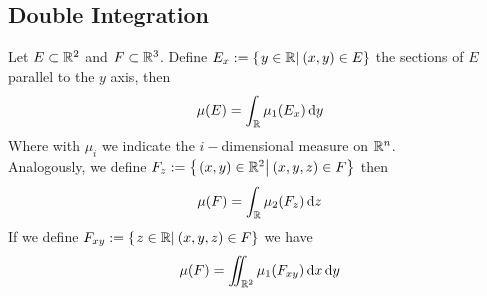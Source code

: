 \documentclass[../complete.tex]{subfiles}
\begin{document}
\subsection{Double Integration}
\begin{thm}
	Let $E\subset\mathbb{R}^2$ and $F\subset\mathbb{R}^3$. Define $E_x:=\left\{ \left.y\in\mathbb{R}\right|_{}(x,y)\in E \right\}$ the sections of $E$ parallel to the $y$ axis, then
	\begin{equation}
		\mu(E)=\int_{\mathbb{R}}^{}\mu_1(E_x)\operatorname{d\!} y
		\label{eq:doubleint1}
	\end{equation}
	Where with $\mu_i$ we indicate the $i-$dimensional measure on $\mathbb{R}^n$.\\
	Analogously, we define $F_z:=\left\{ \left.(x,y)\in\mathbb{R}^2\right|_{}(x,y,z)\in F \right\}$ then
	\begin{equation}
		\mu(F)=\int_{\mathbb{R}}^{}\mu_2(F_z)\operatorname{d\!} z
		\label{eq:tripleint1}
	\end{equation}
	If we define $F_{xy}:=\left\{ \left.z\in\mathbb{R}\right|_{}(x,y,z)\in F \right\}$ we have
	\begin{equation}
		\mu(F)=\iint_{\mathbb{R}^2}\mu_1(F_{xy})\operatorname{d\!} x\operatorname{d\!} y
		\label{eq:tripleint2}
	\end{equation}
\end{thm}
\end{document}
